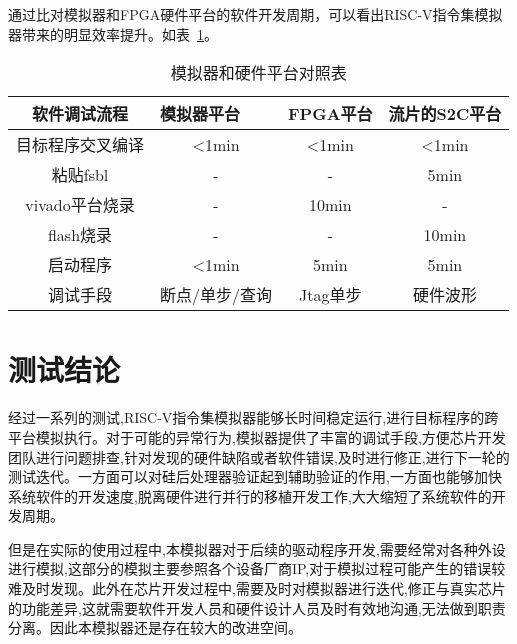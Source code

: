 通过比对模拟器和FPGA硬件平台的软件开发周期，可以看出RISC-V指令集模拟器带来的明显效率提升。如表~\ref{tab:cmp}。
\begin{table}[h]
  \centering
  \caption{模拟器和硬件平台对照表}
  \label{tab:cmp}
  \renewcommand\arraystretch{1.2}
  \renewcommand\arraystretch{1.1}
  \begin{tabular}{cccc}
    \toprule
    \multicolumn{1}{c}{软件调试流程} & \multicolumn{1}{l}{模拟器平台} & \multicolumn{1}{l}{FPGA平台} &\multicolumn{1}{l}{流片的S2C平台}\\
    \midrule
目标程序交叉编译	& \multicolumn{1}{m{3cm}}{<1min} & \multicolumn{1}{m{3cm}}{<1min} & \multicolumn{1}{m{3cm}}{<1min}\\
\hline
粘贴fsbl	& \multicolumn{1}{m{3cm}}{-} & \multicolumn{1}{m{3cm}}{-} & \multicolumn{1}{m{3cm}}{5min}\\
\hline
vivado平台烧录	& \multicolumn{1}{m{3cm}}{-} & \multicolumn{1}{m{3cm}}{10min} & \multicolumn{1}{m{3cm}}{-}\\
\hline
flash烧录	& \multicolumn{1}{m{3cm}}{-} & \multicolumn{1}{m{3cm}}{-} & \multicolumn{1}{m{3cm}}{10min}\\
\hline
启动程序	& \multicolumn{1}{m{3cm}}{<1min} & \multicolumn{1}{m{3cm}}{5min} & \multicolumn{1}{m{3cm}}{5min}\\
\hline
调试手段	& \multicolumn{1}{m{3cm}}{断点/单步/查询} & \multicolumn{1}{m{3cm}}{Jtag单步} & \multicolumn{1}{m{3cm}}{硬件波形}\\
    \bottomrule
  \end{tabular}
\end{table}


\section{测试结论}
经过一系列的测试,RISC-V指令集模拟器能够长时间稳定运行,进行目标程序的跨平台模拟执行。对于可能的异常行为,模拟器提供了丰富的调试手段,方便芯片开发团队进行问题排查,针对发现的硬件缺陷或者软件错误,及时进行修正,进行下一轮的测试迭代。一方面可以对硅后处理器验证起到辅助验证的作用,一方面也能够加快系统软件的开发速度,脱离硬件进行并行的移植开发工作,大大缩短了系统软件的开发周期。


但是在实际的使用过程中,本模拟器对于后续的驱动程序开发,需要经常对各种外设进行模拟,这部分的模拟主要参照各个设备厂商IP,对于模拟过程可能产生的错误较难及时发现。此外在芯片开发过程中,需要及时对模拟器进行迭代,修正与真实芯片的功能差异,这就需要软件开发人员和硬件设计人员及时有效地沟通,无法做到职责分离。因此本模拟器还是存在较大的改进空间。